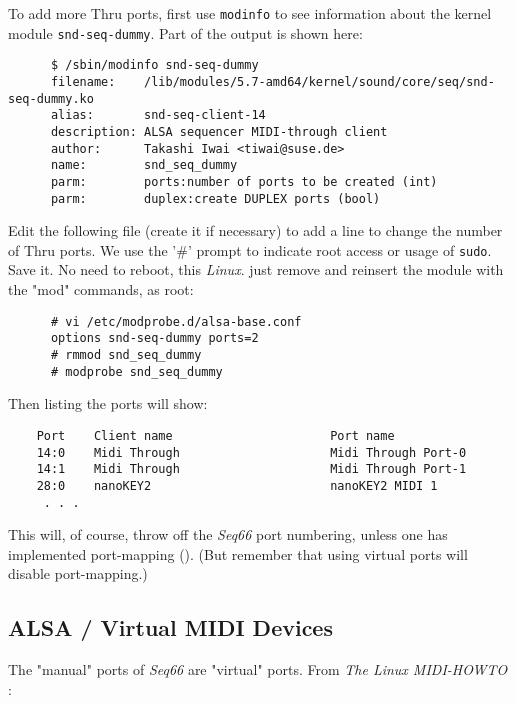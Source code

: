    To add more Thru ports, first use \texttt{modinfo} to see information about
   the kernel module \texttt{snd-seq-dummy}.  Part of the output is shown here:

   \begin{verbatim}
      $ /sbin/modinfo snd-seq-dummy
      filename:    /lib/modules/5.7-amd64/kernel/sound/core/seq/snd-seq-dummy.ko
      alias:       snd-seq-client-14
      description: ALSA sequencer MIDI-through client
      author:      Takashi Iwai <tiwai@suse.de>
      name:        snd_seq_dummy
      parm:        ports:number of ports to be created (int)
      parm:        duplex:create DUPLEX ports (bool)
   \end{verbatim}

   Edit the following file (create it if necessary)
   to add a line to change the number
   of Thru ports.  We use the '\#' prompt to indicate root access or usage of
   \texttt{sudo}.
   Save it.
   No need to reboot, this \textsl{Linux}.
   just remove and reinsert the module with the
   "mod" commands, as root:

   \begin{verbatim}
      # vi /etc/modprobe.d/alsa-base.conf
      options snd-seq-dummy ports=2
      # rmmod snd_seq_dummy
      # modprobe snd_seq_dummy
   \end{verbatim}

   Then listing the ports will show:

   \begin{verbatim}
    Port    Client name                      Port name
    14:0    Midi Through                     Midi Through Port-0
    14:1    Midi Through                     Midi Through Port-1
    28:0    nanoKEY2                         nanoKEY2 MIDI 1
     . . .
   \end{verbatim}

   This will, of course, throw off the \textsl{Seq66} port numbering, unless
   one has implemented port-mapping ().
   (But remember that using virtual ports will disable port-mapping.)

\subsection{ALSA / Virtual MIDI Devices}
\label{subsec:alsa_virtual_midi_devices}

   The "manual" ports of \textsl{Seq66} are "virtual" ports.
   From \textsl{The Linux MIDI-HOWTO} \cite{midihowto}:


